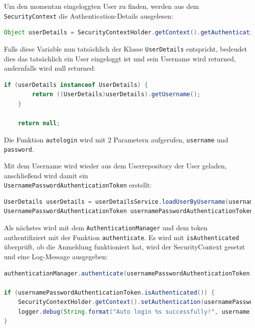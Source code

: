 Um den momentan eingeloggten User zu finden, werden aus dem \verb|SecurityContext| die Authentication-Details ausgelesen:

\begin{lstlisting}[language=Java]
	Object userDetails = SecurityContextHolder.getContext().getAuthentication().getDetails();
\end{lstlisting}

Falls diese Variable nun tatsächlich der Klasse \verb|UserDetails| entspricht, bedeudet dies das tatsächlich ein User eingeloggt ist und sein Username wird returned, andernfalls wird null returned:

\begin{lstlisting}[language=Java]
	if (userDetails instanceof UserDetails) {
		return ((UserDetails)userDetails).getUsername();
	}
	
	return null;
\end{lstlisting} 


Die Funktion \verb|autologin| wird mit 2 Parametern aufgerufen, \verb|username| und \verb|password|. 

Mit dem Username wird wieder aus dem Userrepository der User geladen, anschließend wird damit ein \\
\verb|UsernamePasswordAuthenticationToken| erstellt:

\begin{lstlisting}[language=Java]
UserDetails userDetails = userDetailsService.loadUserByUsername(username);
UsernamePasswordAuthenticationToken usernamePasswordAuthenticationToken = new UsernamePasswordAuthenticationToken(userDetails, password, userDetails.getAuthorities());
	\end{lstlisting}
	
Als nächstes wird mit dem \verb|AuthenticationManager| und dem token authentifiziert mit der Funktion \verb|authenticate|.
Es wird mit \verb|isAuthenticated| überprüft, ob die Anmeldung funktioniert hat, wird der SecurityContext gesetzt und eine Log-Message ausgegeben:

\begin{lstlisting}[language=Java]
authenticationManager.authenticate(usernamePasswordAuthenticationToken);

if (usernamePasswordAuthenticationToken.isAuthenticated()) {
	SecurityContextHolder.getContext().setAuthentication(usernamePasswordAuthenticationToken);
	logger.debug(String.format("Auto login %s successfully!", username));
}
\end{lstlisting}

